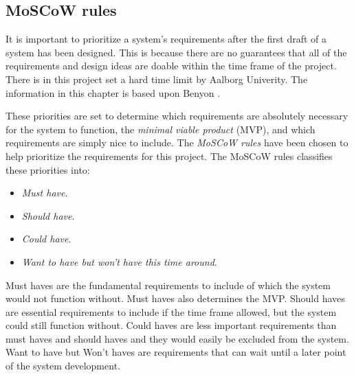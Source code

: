 \subsection{MoSCoW rules}\label{sec:requirements}

It is important to prioritize a system's requirements after the first draft of a system has been designed.
This is because there are no guarantees that all of the requirements and design ideas are doable within the time frame of the project.
There is in this project set a hard time limit by Aalborg Univerity.
The information in this chapter is based upon Benyon \cite{Benyon}.

These priorities are set to determine which requirements are absolutely necessary for the system to function, the \textit{minimal viable product} (MVP),
and which requirements are simply nice to include.
The \textit{MoSCoW rules}
have been chosen to help prioritize the requirements for this project.
The MoSCoW rules classifies these priorities into:

\begin{itemize}
    \item \textit{Must have}.
    \item \textit{Should have}.
    \item \textit{Could have}.
    \item \textit{Want to have but won’t have this time around}.
\end{itemize}

Must haves are the fundamental requirements to include of which the system would not function without.
Must haves also determines the MVP.
Should haves are essential requirements to include if the time frame allowed, but the system could still function without.
Could haves are less important requirements than must haves and should haves and they would easily be excluded from the system.
Want to have but Won't haves are requirements that can wait until a later point of the system development.

